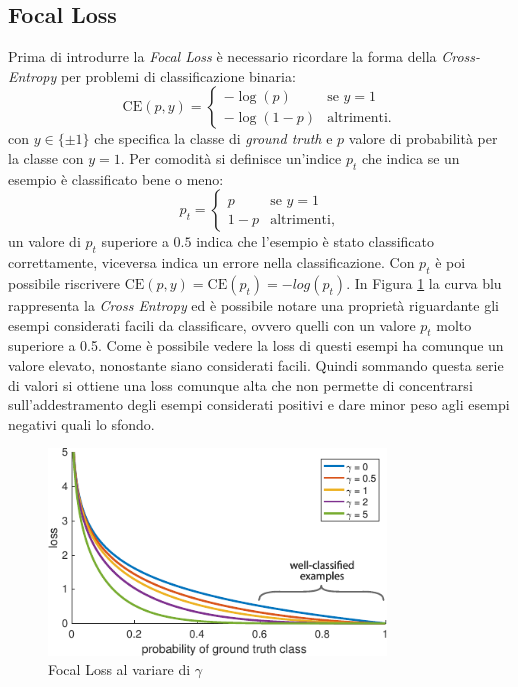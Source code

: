 \subsection{Focal Loss}
\label{subsec:focal_loss}
Prima di introdurre la \textit{Focal Loss} è necessario ricordare la forma della \textit{Cross-Entropy} per problemi di classificazione binaria:
$$\textrm{CE}(p,y) = \begin{cases} -\log(p) &\text{se $y = 1$}\\
-\log (1 - p) &\text{altrimenti.}\end{cases}$$ con $y \in \{\pm 1 \}$ che specifica la classe di \textit{ground truth} e $p$ valore di probabilità per la classe con $y=1$.
Per comodità si definisce un'indice $p_t$ che indica se un esempio è classificato bene o meno:
$$p_t = \begin{cases} p &\text{se $y = 1$}\\ 1 - p &\text{altrimenti,}\end{cases}$$
un valore di $p_t$ superiore a $0.5$ indica che l'esempio è stato classificato correttamente, viceversa indica un errore nella classificazione. Con $p_t$ è poi possibile riscrivere $\textrm{CE}(p, y) = \textrm{CE}(p_t) = -log(p_t)$. In Figura \ref{fig:focal_loss} la curva blu rappresenta la \textit{Cross Entropy} ed è possibile notare una proprietà riguardante gli esempi considerati facili da classificare, ovvero quelli con un valore $p_t$ molto superiore a 0.5. Come è possibile vedere la loss di questi esempi ha comunque un valore elevato, nonostante siano considerati facili. Quindi sommando questa serie di valori si ottiene una loss comunque alta che non permette di concentrarsi sull'addestramento degli esempi considerati positivi e dare minor peso agli esempi negativi quali lo sfondo. 
\begin{figure}
    \centering
    \includegraphics[width=0.8\textwidth]{images/loss.pdf}
    \caption{Focal Loss al variare di $\gamma$}
    \label{fig:focal_loss}
\end{figure}

